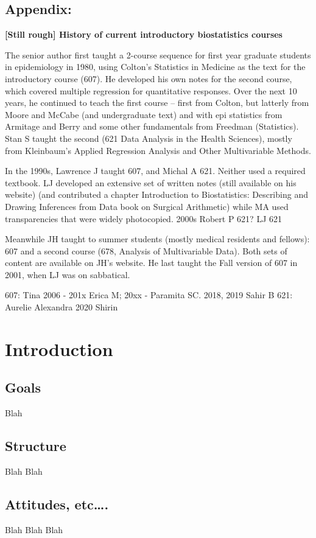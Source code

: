 \documentclass[]{book}
\begin{document}
\hypertarget{appendix}{%
\section{Appendix:}\label{appendix}}

\textbf{{[}Still rough{]} History of current introductory biostatistics courses}

The senior author first taught a 2-course sequence for first year graduate students in epidemiology in 1980, using Colton's Statistics in Medicine as the text for the introductory course (607). He developed his own notes for the second course, which covered multiple regression for quantitative responses. Over the next 10 years, he continued to teach the first course -- first from Colton, but latterly from Moore and McCabe (and undergraduate text) and with epi statistics from Armitage and Berry and some other fundamentals from Freedman
(Statistics). Stan S taught the second (621 Data Analysis in the Health Sciences), mostly from Kleinbaum's Applied Regression Analysis and Other Multivariable Methods.

In the 1990s, Lawrence J taught 607, and Michal A 621. Neither used a required textbook. LJ developed an extensive set of written notes (still available on his website) (and contributed a chapter Introduction to Biostatistics: Describing and Drawing Inferences from Data
book on Surgical Arithmetic) while MA used transparencies that were widely photocopied. 2000s Robert P 621? LJ 621

Meanwhile JH taught to summer students (mostly medical residents and fellows): 607 and a second course (678, Analysis of Multivariable Data). Both sets of content are available on JH's website. He last taught the Fall version of 607 in 2001, when LJ was on sabbatical.

607: Tina 2006 - 201x Erica M; 20xx - Paramita SC. 2018, 2019 Sahir B
621: Aurelie Alexandra 2020 Shirin

\hypertarget{introduction}{%
\chapter{Introduction}\label{introduction}}

\hypertarget{goals}{%
\section{Goals}\label{goals}}

Blah

\hypertarget{structure}{%
\section{Structure}\label{structure}}

Blah Blah

\hypertarget{attitudes-etc.}{%
\section{Attitudes, etc\ldots{}.}\label{attitudes-etc.}}

Blah Blah Blah


\end{document}
